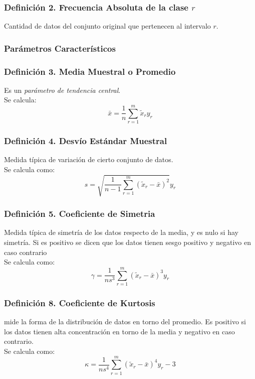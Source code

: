 \documentclass{article}
\newcommand{\sumatoria}[2]{\sum_{#1} ^{#2}}
\begin{document}
\subsubsection*{Definición 2. Frecuencia Absoluta de la clase $r$}
Cantidad de datos del conjunto original que pertenecen al intervalo $r$.

\subsubsection{Parámetros Característicos}
\subsubsection*{Definición 3. Media Muestral o Promedio}
Es un \emph{parámetro de tendencia central}.
\\Se calcula:
\begin{equation*}
    \bar{x} = \frac{1}{n} \sumatoria{r=1}{m} \tilde{x}_r y_r
\end{equation*}

\subsubsection*{Definición 4. Desvío Estándar Muestral}
Medida típica de variación de cierto conjunto de datos.
\\Se calcula como:
\begin{equation*}
    s = \sqrt{\frac{1}{n-1} \sumatoria{r=1}{m} (\tilde{x}_r - \bar{x})^2} y_r
\end{equation*}

\subsubsection*{Definición 5. Coeficiente de Simetria}
Medida típica de simetría de los datos respecto de la media, y es nulo si hay simetría.
Si es positivo se dicen que los datos tienen sesgo positivo y negativo en caso contrario
\\Se calcula como:
\begin{equation*}
    \gamma = \frac{1}{ns^3} \sumatoria{r=1}{m} (\tilde{x}_r - \bar{x})^3 y_r
\end{equation*}

\subsubsection*{Definición 8. Coeficiente de Kurtosis}
mide la forma de la distribución de datos en torno del promedio.
Es positivo si los datos tienen alta concentración en torno de la media y negativo en caso contrario.
\\Se calcula como:
\begin{equation*}
    \kappa = \frac{1}{ns^4} \sumatoria{r=1}{m} (\tilde{x}_r - \bar{x})^4 y_r - 3
\end{equation*}
\end{document}
